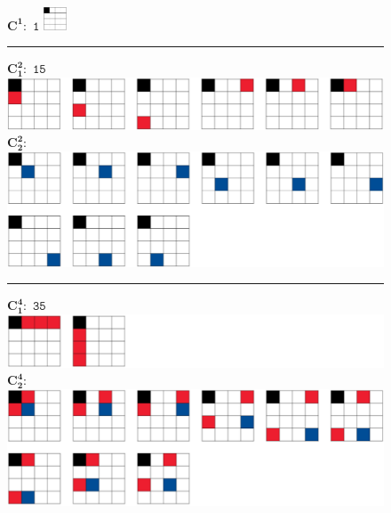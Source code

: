 \documentclass[11pt,xcolor=dvipsnames]{beamer}
\begin{document}
\begin{frame}%
\scriptsize
\begin{columns}
		\begin{column}{.49\textwidth}
			\begin{figure}
			$\boldsymbol{\text{C}^1}:$ \hfill $\mathtt{1}$ \newline
			\includegraphics[width=7mm]{img-congreso/C16.png} \hfill \hfill
			\vspace{1mm}
			\hrule
			\vspace{1mm}
			$\boldsymbol{\text{C}_1^2}:$ \hfill $\mathtt{15}$ \newline
			\includegraphics[width=\textwidth]{img-congreso/C12.png} \newline
			$\boldsymbol{\text{C}_2^2}:$ \hfill \hfill \newline
			\includegraphics[width=\textwidth]{img-congreso/C22.png} \hfill \hfill
			\vspace{1mm}
			\hrule
			\vspace{1mm}
			$\boldsymbol{\text{C}_1^4}:$ \hfill $\mathtt{35}$ \newline
			\includegraphics[width=\textwidth]{img-congreso/C14.png} \newline
			$\boldsymbol{\text{C}_2^4}:$ \hfill \hfill  \newline
			\includegraphics[width=\textwidth]{img-congreso/C24.png} \newline

\end{figure}
\end{column}
\end{columns}
\end{frame}
\end{document}
